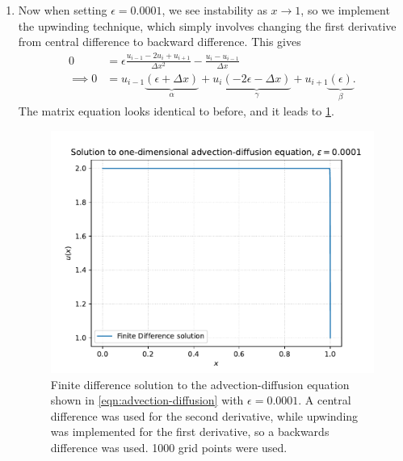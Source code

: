 \documentclass[11pt]{article}
\begin{document}
\begin{enumerate}
\begin{enumerate}
        \item Now when setting $\epsilon=0.0001$, we see instability as $x\rightarrow1$, so we implement the upwinding technique, which simply involves changing the first derivative from central difference to backward difference. This gives
        \begin{align*}
            0&=\epsilon\frac{u_{i-1}-2u_i+u_{i+1}}{\Delta x^2}-\frac{u_{i}-u_{i-1}}{\Delta x}\\
            \implies0&=u_{i-1}\underbrace{\left(\epsilon+\Delta x\right)}_\alpha +u_i\underbrace{(-2\epsilon-\Delta x)}_\gamma +u_{i+1}\underbrace{\left(\epsilon\right)}_\beta.
        \end{align*}
        The matrix equation looks identical to before, and it leads to \cref{fig:q1c}.

        \begin{figure}[h]
            \begin{center}
                \includegraphics[width=.6\textwidth]{Plots/q1c.pdf}
                \caption{Finite difference solution to the advection-diffusion equation shown in \cref{eqn:advection-diffusion} with $\epsilon=0.0001$. A central difference was used for the second derivative, while upwinding was implemented for the first derivative, so a backwards difference was used. 1000 grid points were used.}
                \label{fig:q1c}
            \end{center}
        \end{figure}


\end{enumerate}
\end{enumerate}
\end{document}
